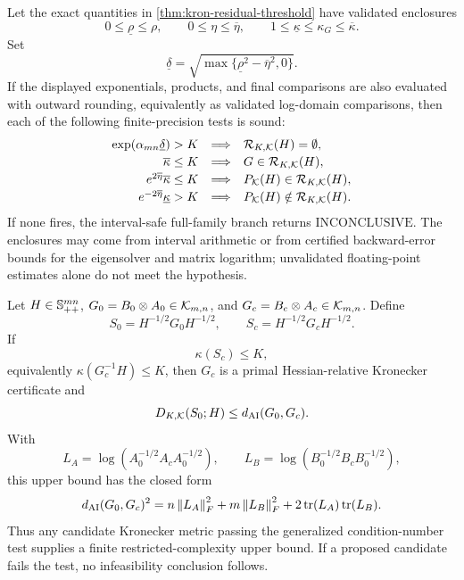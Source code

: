 \begin{corollary}
\label{cor:kron-certify-interval}
Let the exact quantities in \cref{thm:kron-residual-threshold} have validated
enclosures
\[
  0\le \underline\rho\le\rho,
  \qquad
  0\le\eta\le\overline\eta,
  \qquad
  1\le\underline\kappa\le\kappa_G\le\overline\kappa.
\]
Set
\[
  \underline\delta
  =
  \sqrt{\max\{\underline\rho^2-\overline\eta^2,0\}}.
\]
If the displayed exponentials, products, and final comparisons are also
evaluated with outward rounding, equivalently as validated log-domain
comparisons, then each of the following finite-precision tests is sound:
\[
\begin{array}{rcl}
\exp(\alpha_{mn}\underline\delta)>K
&\Longrightarrow& \mathcal R_{K,\mathcal K}(H)=\emptyset,\\[0.2em]
\overline\kappa\le K
&\Longrightarrow& G\in\mathcal R_{K,\mathcal K}(H),\\[0.2em]
e^{2\overline\eta}\overline\kappa\le K
&\Longrightarrow& P_{\mathcal K}(H)\in\mathcal R_{K,\mathcal K}(H),\\[0.2em]
e^{-2\overline\eta}\underline\kappa>K
&\Longrightarrow& P_{\mathcal K}(H)\notin\mathcal R_{K,\mathcal K}(H).
\end{array}
\]
If none fires, the interval-safe full-family branch returns
\(\mathrm{INCONCLUSIVE}\).  The enclosures may come from interval arithmetic
or from certified backward-error bounds for the eigensolver and matrix
logarithm; unvalidated floating-point estimates alone do not meet the
hypothesis.
\end{corollary}

\begin{proposition}
\label{prop:kron-relative-candidate}
Let \(H\in\mathbb S_{++}^{mn}\), \(G_0=B_0\otimes A_0\in\mathcal K_{m,n}\), and
\(G_c=B_c\otimes A_c\in\mathcal K_{m,n}\). Define
\[
  S_0=H^{-1/2}G_0H^{-1/2},
  \qquad
  S_c=H^{-1/2}G_cH^{-1/2}.
\]
If
\[
  \kappa(S_c)\le K,
\]
equivalently \(\kappa(G_c^{-1}H)\le K\), then \(G_c\) is a primal
Hessian-relative Kronecker certificate and
\[
  D_{K,\mathcal K}(S_0;H)\le d_{\mathrm{AI}}(G_0,G_c).
\]
With
\[
  L_A=\log(A_0^{-1/2}A_cA_0^{-1/2}),\qquad
  L_B=\log(B_0^{-1/2}B_cB_0^{-1/2}),
\]
this upper bound has the closed form
\[
  d_{\mathrm{AI}}(G_0,G_c)^2
  =
  n\left\lVert L_A\right\rVert_F^2+m\left\lVert L_B\right\rVert_F^2
  +2\operatorname{tr}(L_A)\operatorname{tr}(L_B).
\]
Thus any candidate Kronecker metric passing the generalized condition-number
test supplies a finite restricted-complexity upper bound. If a proposed
candidate fails the test, no infeasibility conclusion follows.
\end{proposition}

